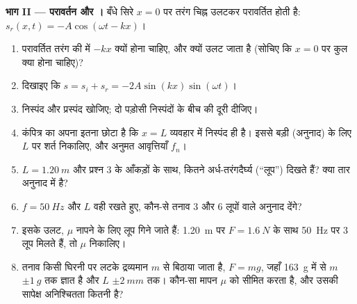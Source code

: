 \begin{problem}[{सप्ताहांत समस्या --- प्रयोग-मेज़ पर कंपित होता एक तार, एक
घिरनी और कुछ बाट, फिर एक गिटार: अर्ध-तरंगदैर्घ्यों की गिनती कैसे फ़्रेटबोर्ड
के हर स्वर को तय कर देती है}]
\medskip
\noindent\textbf{भाग II --- परावर्तन और ।}
बँधे सिरे $x = 0$ पर तरंग चिह्न उलटकर परावर्तित होती है:
$s_r(x, t) = -A\cos(\omega t - kx)$।
\begin{enumerate}[resume]
  \item परावर्तित तरंग की  में $-kx$ क्यों होना चाहिए, और  क्यों
        उलट जाता है (सोचिए कि $x = 0$ पर कुल  क्या होना चाहिए)?
  \item दिखाइए कि $s = s_i + s_r = -2A\sin(kx)\sin(\omega t)$।
  \item निस्पंद और प्रस्पंद खोजिए; दो पड़ोसी निस्पंदों के बीच की दूरी
        दीजिए।
  \item कंपित्र का अपना  इतना छोटा है कि $x = L$ व्यवहार में निस्पंद
        ही है। इससे बड़ी  (अनुनाद) के लिए $L$ पर शर्त निकालिए,
        और अनुमत आवृत्तियाँ $f_n$।
  \item $L = \qty{1.20}{m}$ और प्रश्न 3 के आँकड़ों के साथ, कितने
        अर्ध-तरंगदैर्घ्य (``लूप'') दिखते हैं? क्या तार अनुनाद में है?
  \item $f = \qty{50}{Hz}$ और $L$ वही रखते हुए, कौन-से तनाव $3$ और $6$
        लूपों वाले अनुनाद देंगे?
  \item इसके उलट, $\mu$ नापने के लिए लूप गिने जाते हैं: \qty{1.20}{m} पर
        $F = \qty{1.6}{N}$ के साथ \qty{50}{Hz} पर $3$ लूप मिलते हैं,
        तो $\mu$ निकालिए।
  \item तनाव किसी घिरनी पर लटके द्रव्यमान $m$ से बिठाया जाता है,
        $F = mg$, जहाँ \qty{163}{g} में से $m$ $\pm\qty{1}{g}$ तक ज्ञात है
        और $L$ $\pm\qty{2}{mm}$ तक। कौन-सा मापन $\mu$ को सीमित करता है, और
        उसकी सापेक्ष अनिश्चितता कितनी है?
\end{enumerate}


\end{problem}
